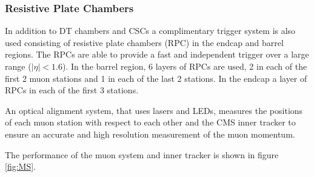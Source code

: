 \subsubsection{Resistive Plate Chambers}
In addition to DT chambers and CSCs a complimentary trigger system is also used
consisting of resistive plate chambers (RPC) in the endcap and barrel regions.
The RPCs are able to provide a fast and independent trigger over a large range
($|\eta| < 1.6$). In the barrel region, 6 layers of RPCs are used, 2 in each of
the first 2 muon stations and 1 in each of the last 2 stations. In the endcap a
layer of RPCs in each of the first 3 stations.

An optical alignment system, that uses lasers and LEDs, measures the positions
of each muon station with respect to each other and the CMS inner tracker to
ensure an accurate and high resolution measurement of the muon
momentum.\cite{cms}

The performance of the muon system and inner tracker is shown in figure
\ref{fig:MS}.

